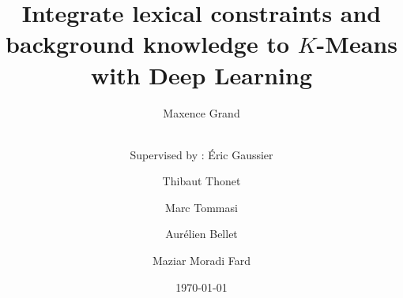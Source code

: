 \title{Integrate lexical constraints and background knowledge to $K$-Means with Deep Learning}
\author{Maxence Grand \and \\                                                   
        Supervised by : \'Eric Gaussier \and Thibaut Thonet \and Marc Tommasi \and Aur\'elien Bellet \and Maziar Moradi Fard} 
\date{\today}
